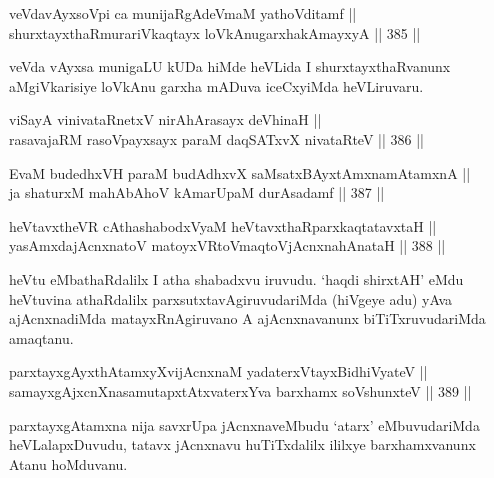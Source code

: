 \begin{shl}
veVdavAyxsoV\s pi ca munijaRgAdeVmaM yathoVditamf || \\
shurxtayxthaRmurariVkaqtayx loVkAnugarxhakAmayxyA \hfill || 385 ||  
\end{shl}

\begin{artha}
veVda vAyxsa munigaLU kUDa hiMde heVLida I shurxtayxthaRvanunx
aMgiVkarisiye loVkAnu garxha mADuva iceCxyiMda heVLiruvaru.
\end{artha}


\begin{shl}
viSayA vinivataRnetxV nirAhArasayx deVhinaH || \\
rasavajaRM rasoV\s payxsayx paraM daqSATxvX nivataRteV \hfill || 386 ||  
\end{shl}

\begin{shl}
EvaM budedhxVH paraM budAdhxvX saMsatxBAyx\s \s tAmxnamAtamxnA || \\
ja shaturxM mahAbAhoV kAmarUpaM durAsadamf \hfill || 387 ||  
\end{shl}



\begin{shl}
heVtavxtheVR cAthashabodxV\s yaM heVtavxthaRparxkaqtatavxtaH || \\
yasAmxdajAcnxnatoV matoyxVR\s toV\s maqtoV\s jAcnxnahAnataH \hfill || 388 ||  
\end{shl}

\begin{artha}
heVtu eMbathaRdalilx I atha shabadxvu iruvudu. `haqdi shirxtAH' eMdu
heVtuvina athaRdalilx parxsutxtavAgiruvudariMda (hiVgeye adu) yAva
ajAcnxnadiMda matayxRnAgiruvano A ajAcnxnavanunx biTiTxruvudariMda
amaqtanu.
\end{artha}


\begin{shl}
parxtayxgAyxthAtamxyXvijAcnxnaM yadaterxVtayxBidhiVyateV || \\
samayxgAjxcnXnasamutapxtAtxvaterxYva barxhamx soV\s shunxteV \hfill || 389 ||  
\end{shl}

\begin{artha}
parxtayxgAtamxna nija savxrUpa jAcnxnaveMbudu `atarx' eMbuvudariMda
heVLalapxDuvudu, tatavx jAcnxnavu huTiTxdalilx ililxye barxhamxvanunx
Atanu hoMduvanu.
\end{artha}

